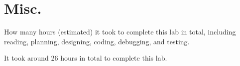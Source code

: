 \documentclass{article}
\newenvironment{solution}{\begin{mdframed}[style=SolutionFrame]}{\end{mdframed}}
\begin{document}
\section{Misc.}
    How many hours (estimated) it took to complete this lab in total, including reading, planning, designing, coding, debugging, and testing.
    \begin{solution}
        It took around 26 hours in total to complete this lab.
    \end{solution}
\end{document}

